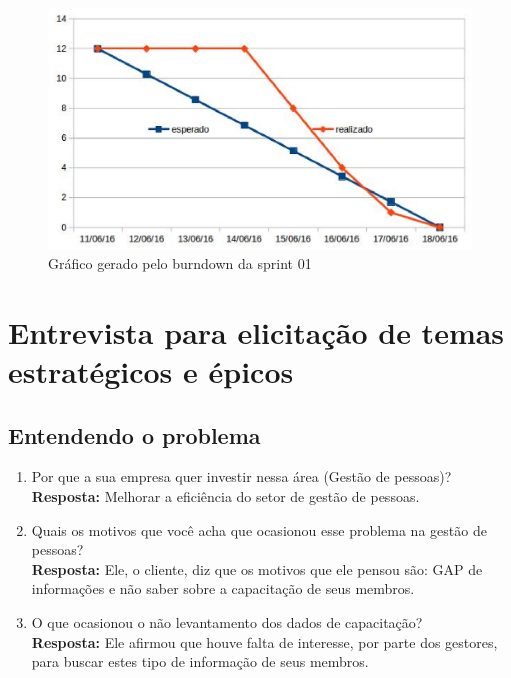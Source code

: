 \begin{anexosenv}
\begin{figure}[H]
    \centering
    \includegraphics[keepaspectratio=true,scale=0.6]{figuras/burndown.eps}
    \caption[Burndown sprint01]{Gráfico gerado pelo burndown da sprint 01}
\end{figure}

\chapter[Entrevista para elicita{\c c}{\~a}o de temas]{Entrevista para elicitação de temas estratégicos e épicos}\label{entrevistaPortfolio}

\section{Entendendo o problema}

\begin{enumerate}
    \item Por que a sua empresa quer investir nessa área (Gestão de pessoas)?
    \newline
    \textbf{Resposta:} Melhorar a eficiência do setor de gestão de pessoas.

    \item Quais os motivos que você acha que ocasionou esse problema na gestão de pessoas?\\
    \newline
    \textbf{Resposta:} Ele, o cliente, diz que os motivos que ele pensou são: GAP de informações e não saber sobre a capacitação de seus membros.

    \item O que ocasionou o não levantamento dos dados de capacitação?\\
    \newline
    \textbf{Resposta:} Ele afirmou que houve falta de interesse, por parte dos gestores, para buscar estes tipo de informação de seus membros.


\end{enumerate}
\end{anexosenv}
